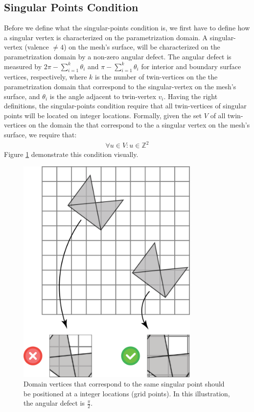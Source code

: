 \subsection{Singular Points Condition}
\label{label:singular_points_cond}
Before we define what the singular-points condition is, we first have to define how a singular vertex is characterized on the parametrization domain. A singular-vertex (valence $\neq 4$) on the mesh's surface, will be characterized on the parametrization domain by a non-zero angular defect. The angular defect is measured by $2\pi - \sum_{i=1}^k \theta_i$ and $\pi - \sum_{i=1}^k \theta_i$ for interior and boundary surface vertices, respectively, where $k$ is the number of twin-vertices on the the parametrization domain that correspond to the singular-vertex on the mesh's surface, and $\theta_i$ is the angle adjacent to twin-vertex $v_i$.
Having the right definitions, the singular-points condition require that all twin-vertices of singular points will be located on integer locations. Formally, given the set $V$ of all twin-vertices on the domain the that correspond to the a singular vertex on the mesh's surface, we require that:
\begin{equation}\label{eq:singular_points_cond}
\begin{split}
\forall u \in V: u \in \mathbb{Z}^2
\end{split}
\end{equation}
Figure \ref{fig:singular_points_req} demonstrate this condition visually.
\begin{figure}[ht]
\centering
\includegraphics[width=9cm]{figures/singular_points/singularity.png}
\caption[The Singular Points Requirement]{Domain vertices that correspond to the same singular point should be positioned at a integer locations (grid points). In this illustration, the angular defect is $\frac{\pi}{2}$.}
\label{fig:singular_points_req}
\end{figure}
